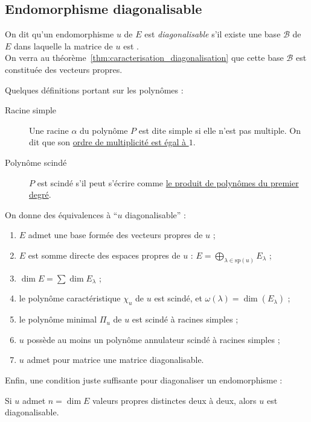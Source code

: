 \documentclass[11pt,a4paper,fleqn,pdftex]{report}
\begin{document}
\subsection{Endomorphisme diagonalisable}
\begin{dfn}
     On dit qu'un endomorphisme $u$ de $E$ est \emph{diagonalisable} s'il existe une base $\mathcal{B}$ de $E$ dans laquelle la matrice de $u$ est .\\
     On verra au théorème~\ref{thm:caracterisation_diagonalisation} que cette base $\mathcal{B}$ est constituée des vecteurs propres.
\end{dfn}
\begin{dfn}
Quelques définitions portant sur les polynômes : 
    \begin{description}
    \item[Racine simple] Une racine $\alpha$ du polynôme $P$ est dite simple si elle n'est pas multiple. On dit que son \uline{ordre de multiplicité est égal à $1$}.
    \item[Polynôme scindé] $P$ est scindé s'il peut s'écrire comme \uline{le produit de polynômes du premier degré}.
    \end{description}
\end{dfn}
\begin{itheorem}\label{thm:caracterisation_diagonalisation}
    On donne des équivalences à ``$u$ diagonalisable'' : 
    \renewcommand{\theenumi}{\roman{enumi}}%
    \begin{enumerate}
        \item $E$ admet une base formée des vecteurs propres de $u$ ;
        \item $E$ est somme directe des espaces propres de $u$ : $E = \bigoplus_{\lambda\in \mathrm{sp}(u)} E_\lambda$ ;
        \item $\dim E = \sum \dim E_\lambda $ ;
        \item le polynôme caractéristique $\chi_u$ de $u$ est scindé, et $\omega (\lambda ) = \dim (E_\lambda)$ ;
        \item le polynôme minimal $\Pi_u$ de $u$ est scindé à racines simples ;
        \item $u$ possède au moins un polynôme annulateur scindé à racines simples ;
        \item $u$ admet pour matrice une matrice diagonalisable.
    \end{enumerate}
\end{itheorem}
Enfin, une condition juste suffisante pour diagonaliser un endomorphisme : 
\begin{theorem}
     Si $u$ admet $n = \dim E$ valeurs propres distinctes deux à deux, alors $u$ est diagonalisable.
\end{theorem}
%
\end{document}
